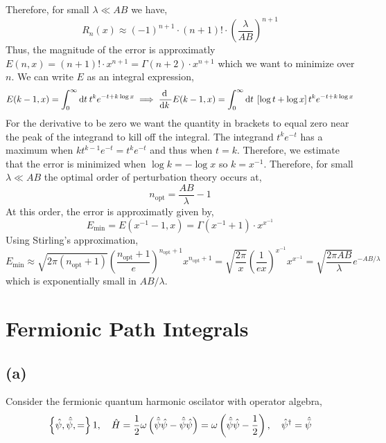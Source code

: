 \documentclass[12pt]{article}
\begin{document}
Therefore, for small $\lambda \ll AB$ we have,
\[ R_n(x) \approx (-1)^{n+1} \cdot (n + 1)! \cdot \left( \frac{\lambda}{AB} \right)^{n+1} \]
Thus, the magnitude of the error is approximatly $E(n,x) = (n + 1)! \cdot x^{n+1} = \Gamma(n + 2) \cdot x^{n+1}$ which we want to minimize over $n$.
We can write $E$ as an integral expression,
\[ E(k-1,x) = \int_0^\infty \mathrm{d}t \: t^k e^{-t + k \log{x} } \implies \frac{\mathrm{d} \:}{\mathrm{d}k \:} E(k-1, x) = \int_0^\infty \mathrm{d}t \: \left[ \log{t} + \log{x} \right] t^k e^{-t + k \log{x} }  \]
For the derivative to be zero we want the quantity in brackets to equal zero near the peak of the integrand to kill off the integral. The integrand $t^k e^{-t}$ has a maximum when $k t^{k-1} e^{-t} = t^k e^{-t}$ and thus when $t = k$. Therefore, we estimate that the error is minimized when $\log{k} = - \log{x}$ so $k = x^{-1}$. Therefore, for small $\lambda \ll AB$ the optimal order of perturbation theory occurs at,
\[ n_{\text{opt}} = \frac{AB}{\lambda} - 1 \]
At this order, the error is approximatly given by,
\[ E_{\text{min}} = E(x^{-1}-1, x) = \Gamma(x^{-1} + 1) \cdot x^{x^{-1}} \]
Using Stirling's approximation,  
\[ E_{\text{min}} \approx \sqrt{2 \pi (n_{\text{opt}} + 1)} \left( \frac{n_{\text{opt}} + 1}{e} \right)^{n_{\text{opt}} + 1}  x^{n_{\text{opt}} + 1} = \sqrt{\frac{2 \pi}{x}} \left( \frac{1}{e x} \right)^{x^{-1}} x^{x^{-1}} = \sqrt{\frac{2 \pi AB}{\lambda}} e^{-AB/\lambda} \]
which is exponentially small in $AB / \lambda$. 


\section{Fermionic Path Integrals}

\subsection{(a)}

\newcommand{\hpsi}{\hat{\psi}}
\newcommand{\bpsi}{\hat{\bar{\psi}}}

Consider the fermionic quantum harmonic oscilator with operator algebra,
\[ \anticom{\hpsi, \bpsi} = 1, \quad \hamilt = \frac{1}{2} \omega \left( \bpsi \hpsi - \bpsi \hpsi \right) = \omega \left( \bpsi \hpsi - \frac{1}{2} \right), \quad \hpsi^\dagger = \bpsi \]
\end{document}

